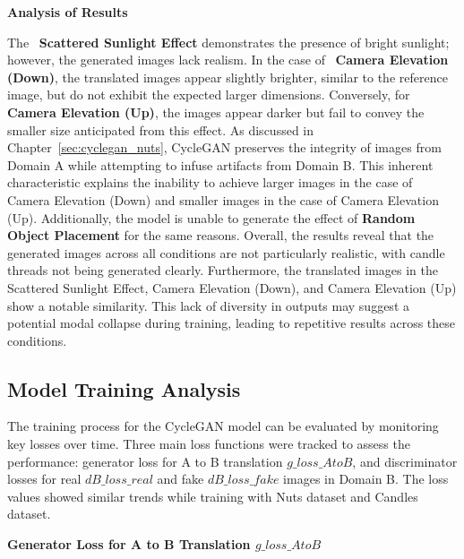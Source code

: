 \documentclass[12pt,DIV14,BCOR12mm,a4paper,footinclude=false,headinclude,parskip=half-,twoside,openright,cleardoublepage=empty,toc=index,bibliography=totoc,listof=totoc]{scrreprt}
\numberwithin{equation}{chapter}
\begin{document}
\textbf{Analysis of Results}

The ~\textbf{Scattered Sunlight Effect} demonstrates the presence of bright sunlight; however, the generated images lack realism. In the case of ~\textbf{Camera Elevation (Down)}, the translated images appear slightly brighter, similar to the reference image, but do not exhibit the expected larger dimensions. Conversely, for \textbf{Camera Elevation (Up)}, the images appear darker but fail to convey the smaller size anticipated from this effect. As discussed in Chapter~\ref{sec:cyclegan_nuts}, CycleGAN preserves the integrity of images from Domain A while attempting to infuse artifacts from Domain B. This inherent characteristic explains the inability to achieve larger images in the case of Camera Elevation (Down) and smaller images in the case of Camera Elevation (Up). Additionally, the model is unable to generate the effect of \textbf{Random Object Placement} for the same reasons. Overall, the results reveal that the generated images across all conditions are not particularly realistic, with candle threads not being generated clearly. Furthermore, the translated images in the Scattered Sunlight Effect, Camera Elevation (Down), and Camera Elevation (Up) show a notable similarity. This lack of diversity in outputs may suggest a potential modal collapse during training, leading to repetitive results across these conditions.

\subsection{Model Training Analysis}

The training process for the CycleGAN model can be evaluated by monitoring key losses over time. Three main loss functions were tracked to assess the performance: generator loss for A to B translation \( g\_loss\_AtoB \), and discriminator losses for real \( dB\_loss\_real \) and fake \( dB\_loss\_fake \) images in Domain B. The loss values showed similar trends while training with Nuts dataset and Candles dataset.

\textbf{Generator Loss for A to B Translation \( g\_loss\_AtoB \)}
\end{document}
